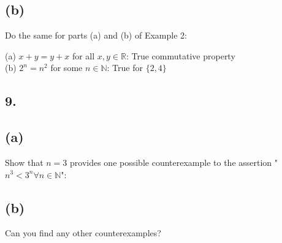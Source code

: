 \documentclass[11pt]{article}
\begin{document}
\subsection*{(b)}
\begin{center}
Do the same for parts (a) and (b) of Example 2:
\end{center}

\begin{flushleft}
(a) $x + y = y + x$ for all $x,y \in \mathbb{R}$: True commutative property\\
(b) $2^{n} = n^{2}$ for some $n \in \mathbb{N}$: True for $\{2,4\}$\\
\end{flushleft}
%
%
\subsection*{9.}

\subsection*{(a)}
\begin{center}
Show that $n = 3$ provides one possible counterexample to the assertion "$n^{3} < 3^{n} \forall n \in \mathbb{N}$":\\

\end{center}

\subsection*{(b)}
\begin{center}
Can you find any other counterexamples?\\

\end{center}
\end{document}
